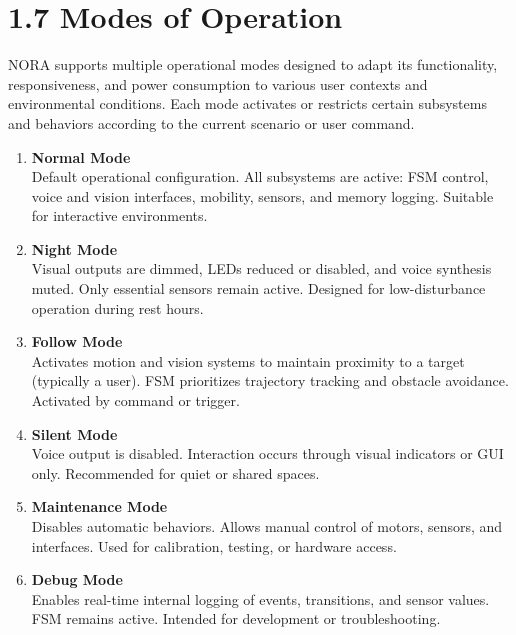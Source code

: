 \section*{1.7 Modes of Operation}

NORA supports multiple operational modes designed to adapt its functionality, responsiveness, and power consumption to various user contexts and environmental conditions. Each mode activates or restricts certain subsystems and behaviors according to the current scenario or user command.

\vspace{0.5cm}

\begin{enumerate}
    \item \textbf{Normal Mode} \\
    Default operational configuration. All subsystems are active: FSM control, voice and vision interfaces, mobility, sensors, and memory logging. Suitable for interactive environments.

    \item \textbf{Night Mode} \\
    Visual outputs are dimmed, LEDs reduced or disabled, and voice synthesis muted. Only essential sensors remain active. Designed for low-disturbance operation during rest hours.

    \item \textbf{Follow Mode} \\
    Activates motion and vision systems to maintain proximity to a target (typically a user). FSM prioritizes trajectory tracking and obstacle avoidance. Activated by command or trigger.

    \item \textbf{Silent Mode} \\
    Voice output is disabled. Interaction occurs through visual indicators or GUI only. Recommended for quiet or shared spaces.

    \item \textbf{Maintenance Mode} \\
    Disables automatic behaviors. Allows manual control of motors, sensors, and interfaces. Used for calibration, testing, or hardware access.

    \item \textbf{Debug Mode} \\
    Enables real-time internal logging of events, transitions, and sensor values. FSM remains active. Intended for development or troubleshooting.


\end{enumerate}
